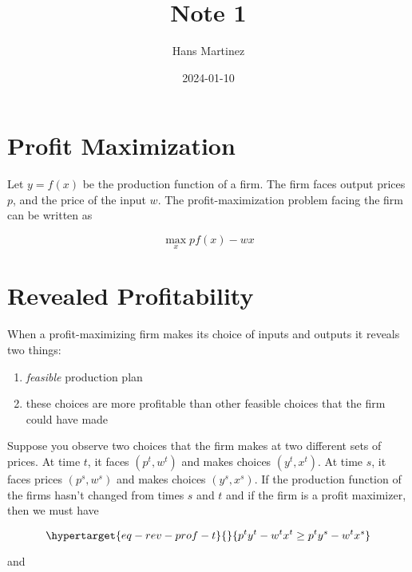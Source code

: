 \documentclass[
]{article}
\title{Note 1}
\author{Hans Martinez}
\date{2024-01-10}
\providecommand{\tightlist}{%
  \setlength{\itemsep}{0pt}\setlength{\parskip}{0pt}}\usepackage{longtable,booktabs,array}
\begin{document}
\maketitle
\ifdefined\Shaded\renewenvironment{Shaded}{\begin{tcolorbox}[interior hidden, boxrule=0pt, enhanced, frame hidden, breakable, sharp corners, borderline west={3pt}{0pt}{shadecolor}]}{\end{tcolorbox}}\fi

\hypertarget{profit-maximization}{%
\section{Profit Maximization}\label{profit-maximization}}

Let \(y=f(x)\) be the production function of a firm. The firm faces
output prices \(p\), and the price of the input \(w\). The
profit-maximization problem facing the firm can be written as

\[
\max_x pf(x)-wx
\]

\hypertarget{revealed-profitability}{%
\section{Revealed Profitability}\label{revealed-profitability}}

When a profit-maximizing firm makes its choice of inputs and outputs it
reveals two things:

\begin{enumerate}
\def\labelenumi{\arabic{enumi}.}
\tightlist
\item
  \emph{feasible} production plan
\item
  these choices are more profitable than other feasible choices that the
  firm could have made
\end{enumerate}

Suppose you observe two choices that the firm makes at two different
sets of prices. At time \(t\), it faces \((p^t,w^t)\) and makes choices
\((y^t,x^t)\). At time \(s\), it faces prices \((p^s,w^s)\) and makes
choices \((y^s,x^s)\). If the production function of the firms hasn't
changed from times \(s\) and \(t\) and if the firm is a profit
maximizer, then we must have

\begin{equation}\protect\hypertarget{eq-rev-prof-t}{}{
p^ty^t-w^tx^t\ge p^ty^s-w^tx^s
}\label{eq-rev-prof-t}\end{equation}

and
\end{document}
